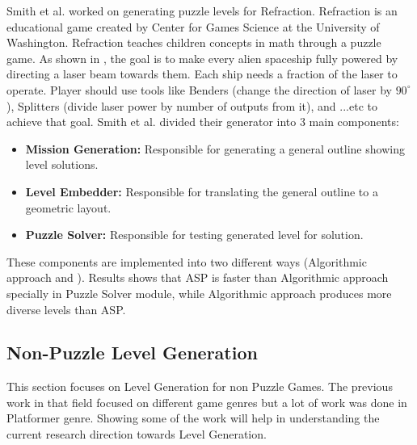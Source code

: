 
Smith et al.\cite{refractionStudy} worked on generating puzzle levels for Refraction. Refraction is an educational game created by Center for Games Science at the University of Washington. Refraction teaches children concepts in math through a puzzle game. As shown in , the goal is to make every alien spaceship fully powered by directing a laser beam towards them. Each ship needs a fraction of the laser to operate. Player should use tools like Benders (change the direction of laser by $90^{\circ}$), Splitters (divide laser power by number of outputs from it), and ...etc to achieve that goal. Smith et al. divided their generator into 3 main components: 
\begin{itemize} \itemsep0pt \parskip0pt 
	\item \textbf{Mission Generation:} Responsible for generating a general outline showing level solutions. 
	\item \textbf{Level Embedder:} Responsible for translating the general outline to a geometric layout.
	\item \textbf{Puzzle Solver:} Responsible for testing generated level for solution.
\end{itemize} 
These components are implemented into two different ways (Algorithmic approach and ). Results shows that ASP is faster than Algorithmic approach specially in Puzzle Solver module, while Algorithmic approach produces more diverse levels than ASP.

\subsection{Non-Puzzle Level Generation}
This section focuses on Level Generation for non Puzzle Games. The previous work in that field focused on different game genres but a lot of work was done in Platformer genre. Showing some of the work will help in understanding the current research direction towards Level Generation.\\\par

